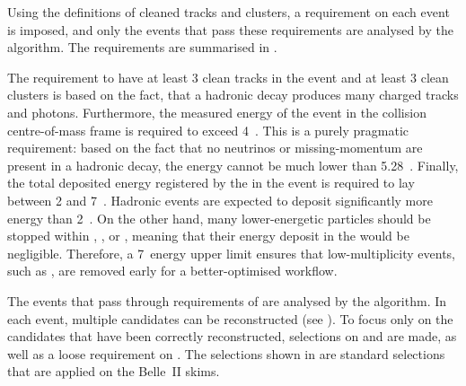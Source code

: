 Using the definitions of cleaned tracks and \ECL clusters, a requirement on each event is imposed, and only the events that pass these requirements are analysed by the \FEI algorithm.
The requirements are summarised in .

\begin{table}[htbp!]
    \centering
     \caption{\label{tab:fei_precuts} Selections before running the \FEI algorithm.
     Cleaned tracks and clusters are defined in .
     }
\end{table}
The requirement to have at least 3 clean tracks in the event and at least 3 clean \ECL clusters is based on the fact, that a hadronic decay produces many charged tracks and photons.
Furthermore, the measured energy of the event in the \epem collision centre-of-mass frame is required to exceed 4~\gev.
This is a purely pragmatic requirement: based on the fact that no neutrinos or missing-momentum are present in a hadronic decay, the energy cannot be much lower than 5.28~\gev.
Finally, the total deposited energy registered by the \ECL in the event is required to lay between 2 and 7~\gev.
Hadronic events are expected to deposit significantly more energy than 2~\gev.
On the other hand, many lower-energetic particles should be stopped within \PXD, \SVD, \CDC or \TOP, meaning that their energy deposit in the \ECL would be negligible.
Therefore, a 7~\gev \ECL energy upper limit ensures that low-multiplicity events, such as \epem\ra\epem, are removed early for a better-optimised workflow.

The events that pass through requirements of  are analysed by the \FEI algorithm.
In each event, multiple \FEI candidates can be reconstructed (see ).
To focus only on the candidates that have been correctly reconstructed, selections on \DeltaE and \Mbc are made, as well as a loose requirement on \feiProb.
The selections shown in  are standard selections that are applied on the Belle~II \FEI skims.

